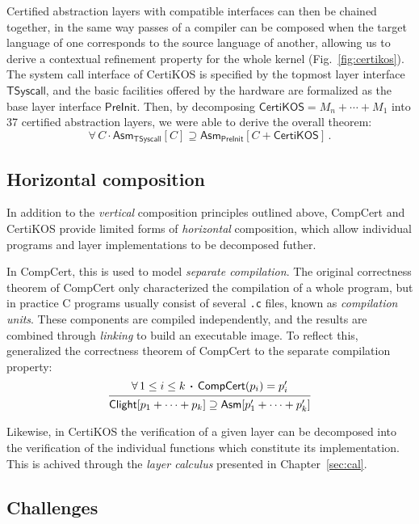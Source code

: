 \documentclass[11pt,oneside,draft]{book}
\theoremstyle{definition}
\newcommand{\kw}[1]{\ensuremath{ \mathsf{#1} }}
\newcommand{\bdot}{\boldsymbol{\cdot}}
\begin{document}
Certified abstraction layers
with compatible interfaces can then be chained together,
in the same way passes of a compiler
can be composed when the target language of one
corresponds to the source language of another,
allowing us to derive a contextual refinement property
for the whole kernel (Fig.~\ref{fig:certikos}).
The system call interface of CertiKOS is specified
by the topmost layer interface $\kw{TSyscall}$,
and the basic facilities offered by the hardware
are formalized as the base layer interface $\kw{PreInit}$.
Then, by decomposing $\kw{CertiKOS} = M_n + \cdots + M_1$
into 37 certified abstraction layers,
we were able to derive the overall theorem:
\[
  \forall \, C \, \bdot \,
    \kw{Asm}_{\kw{TSyscall}}[C]
    \supseteq
    \kw{Asm}_{\kw{PreInit}}[C + \kw{CertiKOS}] \,.
\]


\subsection{Horizontal composition} %

In addition to
the \emph{vertical} composition principles outlined above,
CompCert and CertiKOS provide limited forms of
\emph{horizontal} composition,
which allow individual programs and layer implementations
to be decomposed futher.

In CompCert,
this is used to model \emph{separate compilation}.
The original correctness theorem of CompCert
only characterized the compilation of a whole program,
but in practice C programs usually consist of
several \texttt{.c} files, known as \emph{compilation units}.
These components are compiled independently,
and the results are combined through \emph{linking} to build
an executable image.
To reflect this,
\citet{sepcompcert} generalized the correctness theorem of CompCert
to the separate compilation property:
\[
  \begin{prooftree}
    \hypo{\forall \, 1 \le i \le k \, \bdot \,
      \kw{CompCert}(p_i) = p_i'}
    \infer1{\kw{Clight}[p_1 + \cdots + p_k] \supseteq
      \kw{Asm}[p_1' + \cdots + p_k']}
  \end{prooftree}
\]

Likewise,
in CertiKOS the verification of a given layer
can be decomposed into
the verification of the individual functions
which constitute its implementation.
This is achived through the \emph{layer calculus}
presented in Chapter~\ref{sec:cal}.


\subsection{Challenges} %
\end{document}

